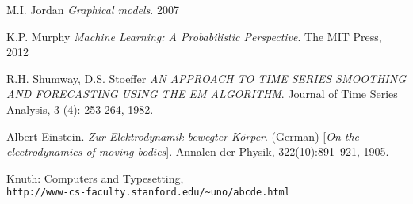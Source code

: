 \documentclass[11pt, reqno]{article}
\numberwithin{equation}{section}
\begin{document}
\begin{thebibliography}{9}

M.I. Jordan
\textit{Graphical models}. 
2007

K.P. Murphy
\textit{Machine Learning: A Probabilistic Perspective}. 
The MIT Press, 2012

R.H. Shumway, D.S. Stoeffer 
\textit{AN APPROACH TO TIME SERIES SMOOTHING AND FORECASTING USING THE EM ALGORITHM}. 
Journal of Time Series Analysis, 3 (4): 253-264, 1982.

Albert Einstein. 
\textit{Zur Elektrodynamik bewegter K{\"o}rper}. (German) 
[\textit{On the electrodynamics of moving bodies}]. 
Annalen der Physik, 322(10):891–921, 1905.

Knuth: Computers and Typesetting,
\\\texttt{http://www-cs-faculty.stanford.edu/\~{}uno/abcde.html}
\end{thebibliography}
\end{document}
